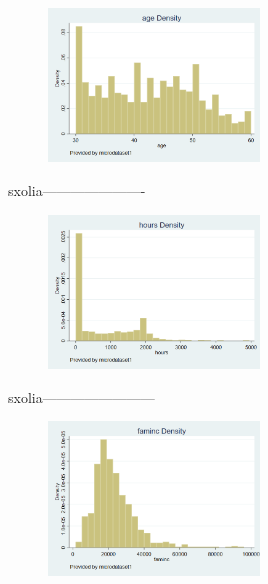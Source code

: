\documentclass{article}
\begin{document}
	\begin{figure}
		\centering
		\includegraphics[width=0.5\textwidth]{age density.png}
		\caption{\label{fig:plot} }
	\end{figure}
	
	\vspace {0.5\baselineskip}
	
	sxolia----------------------
	
	\vspace {0.5\baselineskip}
	
	\begin{figure}
		\centering
		\includegraphics[width=0.5\textwidth]{hours density.png}
		\caption{\label{fig:plot} }
	\end{figure}
	
	\vspace {0.5\baselineskip}
	
	sxolia------------------------
	
	\vspace {0.5\baselineskip}
	
	\begin{figure}
		\centering
		\includegraphics[width=0.5\textwidth]{faminc density.png}
		\caption{\label{fig:plot} }
	\end{figure}
	
\end{document}

